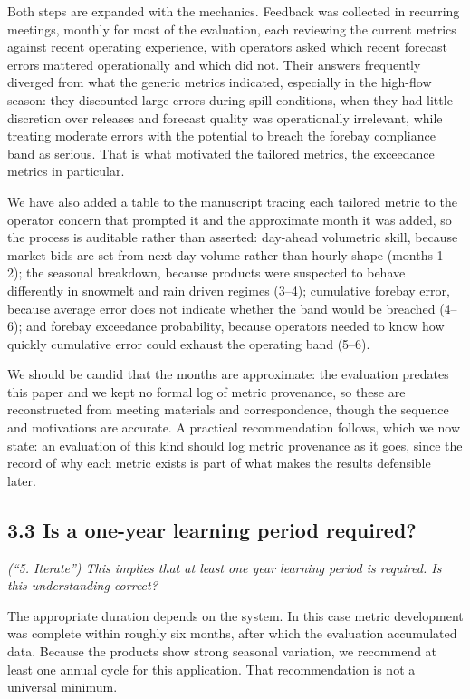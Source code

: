 \documentclass[11pt]{article}
\newenvironment{rc}%
  {\begin{list}{}{\setlength{\leftmargin}{1.5em}\setlength{\rightmargin}{1.5em}%
   \setlength{\topsep}{0.2em}\setlength{\parsep}{0pt}\setlength{\itemsep}{0pt}}%
   \item[]\itshape\color{quotegray}}%
  {\end{list}}
\begin{document}
Both steps are expanded with the mechanics. Feedback was collected in recurring meetings, monthly
for most of the evaluation, each reviewing the current metrics against recent operating experience,
with operators asked which recent forecast errors mattered operationally and which did not. Their
answers frequently diverged from what the generic metrics indicated, especially in the high-flow
season: they discounted large errors during spill conditions, when they had little discretion over
releases and forecast quality was operationally irrelevant, while treating moderate errors with the
potential to breach the forebay compliance band as serious. That is what motivated the tailored
metrics, the exceedance metrics in particular.

We have also added a table to the manuscript tracing each tailored metric to the operator concern
that prompted it and the approximate month it was added, so the process is auditable rather than
asserted: day-ahead volumetric skill, because market bids are set from next-day volume rather than
hourly shape (months 1--2); the seasonal breakdown, because products were suspected to behave
differently in snowmelt and rain driven regimes (3--4); cumulative forebay error, because average
error does not indicate whether the band would be breached (4--6); and forebay exceedance
probability, because operators needed to know how quickly cumulative error could exhaust the
operating band (5--6).

We should be candid that the months are approximate: the evaluation predates this paper and we
kept no formal log of metric provenance, so these are reconstructed from meeting materials and
correspondence, though the sequence and motivations are accurate. A practical recommendation
follows, which we now state: an evaluation of this kind should log metric provenance as it goes,
since the record of why each metric exists is part of what makes the results defensible later.

\subsection*{3.3 Is a one-year learning period required?}

\begin{rc}
(``5. Iterate'') This implies that at least one year learning period is required. Is this
understanding correct?
\end{rc}

The appropriate duration depends on the system. In this case metric development was complete
within roughly six months, after which the evaluation accumulated data. Because the products
show strong seasonal variation, we recommend at least one annual cycle for this application.
That recommendation is not a universal minimum.
\end{document}
